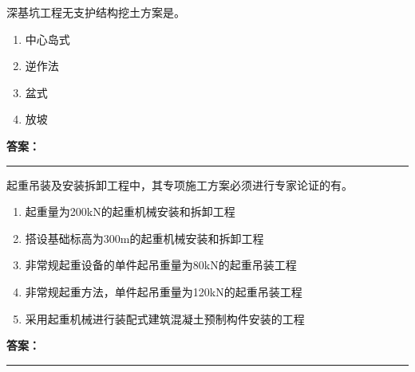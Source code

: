 \documentclass[UTF8,fontset=fandol,11pt]{ctexart}
\newcommand{\answerline}{\textcolor{answerred}{\rule{2.4cm}{0.7pt}}}
\begin{document}
\vspace{0.2em}

\begin{quizbox}[title={乱序第 204 题｜第一章土方工程}]

深基坑工程无支护结构挖土方案是。\\

\begin{enumerate}[label=\Alph*.]

\item 中心岛式

\item 逆作法

\item 盆式

\item 放坡

\end{enumerate}

\textbf{\textcolor{answerred}{答案：}} \answerline

\end{quizbox}

\vspace{0.2em}

\begin{quizbox}[title={乱序第 205 题｜第七章脚手架工程}]

起重吊装及安装拆卸工程中，其专项施工方案必须进行专家论证的有。\\

\begin{enumerate}[label=\Alph*.]

\item 起重量为200kN的起重机械安装和拆卸工程

\item 搭设基础标高为300m的起重机械安装和拆卸工程

\item 非常规起重设备的单件起吊重量为80kN的起重吊装工程

\item 非常规起重方法，单件起吊重量为120kN的起重吊装工程

\item 采用起重机械进行装配式建筑混凝土预制构件安装的工程

\end{enumerate}

\textbf{\textcolor{answerred}{答案：}} \answerline

\end{quizbox}

\vspace{0.2em}
\end{document}
